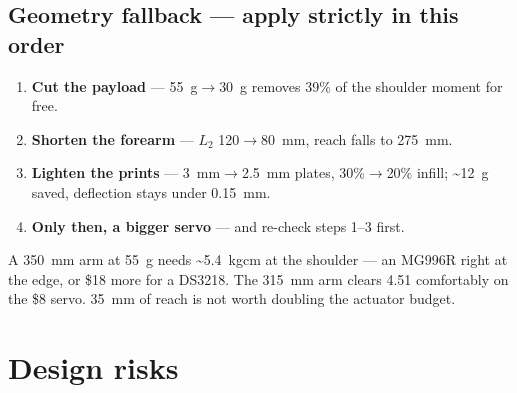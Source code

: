 \documentclass[11pt]{article}
\begin{document}
\subsection{Geometry fallback --- apply strictly in this order}
\begin{enumerate}
\item \textbf{Cut the payload} --- 55~g$\to$30~g removes 39\% of the shoulder moment for free.
\item \textbf{Shorten the forearm} --- $L_2$ 120$\to$80~mm, reach falls to 275~mm.
\item \textbf{Lighten the prints} --- 3~mm$\to$2.5~mm plates, 30\%$\to$20\% infill; \textasciitilde12~g saved, deflection stays under 0.15~mm.
\item \textbf{Only then, a bigger servo} --- and re-check steps 1--3 first.
\end{enumerate}

A 350~mm arm at 55~g needs \textasciitilde5.4~kg\textperiodcentered cm at the shoulder --- an MG996R right at the edge, or \$18 more for a DS3218. The 315~mm arm clears 4.51 comfortably on the \$8 servo. 35~mm of reach is not worth doubling the actuator budget.

\section{Design risks}
\end{document}
